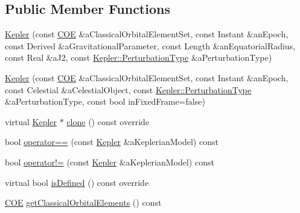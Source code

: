\subsection*{Public Member Functions}
\begin{DoxyCompactItemize}
\item 
\hyperlink{classostk_1_1astro_1_1trajectory_1_1orbit_1_1models_1_1_kepler_a9bf6dd4dbd63bb2551fa649b59ae297b}{Kepler} (const \hyperlink{classostk_1_1astro_1_1trajectory_1_1orbit_1_1models_1_1kepler_1_1_c_o_e}{C\+OE} \&a\+Classical\+Orbital\+Element\+Set, const Instant \&an\+Epoch, const Derived \&a\+Gravitational\+Parameter, const Length \&an\+Equatorial\+Radius, const Real \&a\+J2, const \hyperlink{classostk_1_1astro_1_1trajectory_1_1orbit_1_1models_1_1_kepler_a3750f9177ff06a1938826e2c2881d5a9}{Kepler\+::\+Perturbation\+Type} \&a\+Perturbation\+Type)
\item 
\hyperlink{classostk_1_1astro_1_1trajectory_1_1orbit_1_1models_1_1_kepler_afc95c7ec38bba8e24eba704c408523b6}{Kepler} (const \hyperlink{classostk_1_1astro_1_1trajectory_1_1orbit_1_1models_1_1kepler_1_1_c_o_e}{C\+OE} \&a\+Classical\+Orbital\+Element\+Set, const Instant \&an\+Epoch, const Celestial \&a\+Celestial\+Object, const \hyperlink{classostk_1_1astro_1_1trajectory_1_1orbit_1_1models_1_1_kepler_a3750f9177ff06a1938826e2c2881d5a9}{Kepler\+::\+Perturbation\+Type} \&a\+Perturbation\+Type, const bool in\+Fixed\+Frame=false)
\item 
virtual \hyperlink{classostk_1_1astro_1_1trajectory_1_1orbit_1_1models_1_1_kepler}{Kepler} $\ast$ \hyperlink{classostk_1_1astro_1_1trajectory_1_1orbit_1_1models_1_1_kepler_afb76b3571c73fb5c87129033f7d66520}{clone} () const override
\item 
bool \hyperlink{classostk_1_1astro_1_1trajectory_1_1orbit_1_1models_1_1_kepler_a0fa60d97287b75564e1e5a2390f137f4}{operator==} (const \hyperlink{classostk_1_1astro_1_1trajectory_1_1orbit_1_1models_1_1_kepler}{Kepler} \&a\+Keplerian\+Model) const
\item 
bool \hyperlink{classostk_1_1astro_1_1trajectory_1_1orbit_1_1models_1_1_kepler_aac43844f43000a181bf504529763bc82}{operator!=} (const \hyperlink{classostk_1_1astro_1_1trajectory_1_1orbit_1_1models_1_1_kepler}{Kepler} \&a\+Keplerian\+Model) const
\item 
virtual bool \hyperlink{classostk_1_1astro_1_1trajectory_1_1orbit_1_1models_1_1_kepler_a4c74402d5483a51e5e0fe1920cd52ec4}{is\+Defined} () const override
\item 
\hyperlink{classostk_1_1astro_1_1trajectory_1_1orbit_1_1models_1_1kepler_1_1_c_o_e}{C\+OE} \hyperlink{classostk_1_1astro_1_1trajectory_1_1orbit_1_1models_1_1_kepler_a1a5e2d4a27c4e20d91924a3a751cbba4}{get\+Classical\+Orbital\+Elements} () const

\end{DoxyCompactItemize}
